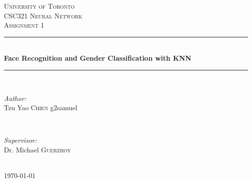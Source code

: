 \documentclass[12pt]{article} %
\begin{document}

\begin{titlepage}

\newcommand{\HRule}{\rule{\linewidth}{0.5mm}} %

\center %

\textsc{\LARGE University of Toronto}\\[1.5cm] %
\textsc{\Large CSC321 Neural Network}\\[0.5cm] %
\textsc{\large Assignment 1}\\[0.5cm] %

\HRule \\[0.4cm]
{ \huge \bfseries Face Recognition and Gender Classification with KNN}\\[0.4cm] %
\HRule \\[1.5cm]

\begin{minipage}{0.4\textwidth}
\begin{flushleft} \large
\emph{Author:}\\
Tzu Yao \textsc{Chien} %
\break
g2samuel
\end{flushleft}
\end{minipage}
~
\begin{minipage}{0.4\textwidth}
\begin{flushright} \large
\emph{Supervisor:} \\
Dr. Michael \textsc{Guerzhoy} %
\end{flushright}
\end{minipage}\\[4cm]

{\large \today}\\[3cm] %


\vfill %

\end{titlepage}
\end{document}
